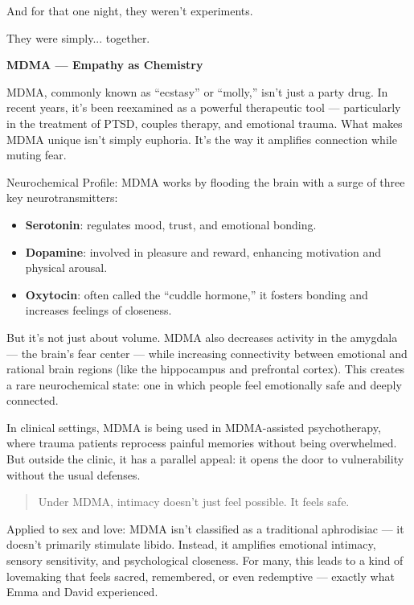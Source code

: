 And for that one night, they weren't experiments.

They were simply... together.

\begin{TechnicalSidebar}{\textbf{MDMA — Empathy as Chemistry}}

  MDMA, commonly known as “ecstasy” or “molly,” isn’t just a party drug. In recent years, it's been reexamined as a powerful therapeutic tool — particularly in the treatment of PTSD, couples therapy, and emotional trauma. What makes MDMA unique isn’t simply euphoria. It’s the way it amplifies connection while muting fear.
  
  \medskip
  
  Neurochemical Profile:
  MDMA works by flooding the brain with a surge of three key neurotransmitters:

  \medskip
  
  \begin{itemize}
    \item \textbf{Serotonin}: regulates mood, trust, and emotional bonding.
    \item \textbf{Dopamine}: involved in pleasure and reward, enhancing motivation and physical arousal.
    \item \textbf{Oxytocin}: often called the “cuddle hormone,” it fosters bonding and increases feelings of closeness.
  \end{itemize}
  
  But it’s not just about volume. MDMA also decreases activity in the amygdala — the brain’s fear center — while increasing connectivity between emotional and rational brain regions (like the hippocampus and prefrontal cortex). This creates a rare neurochemical state: one in which people feel emotionally safe and deeply connected.
  
  \medskip
  
  In clinical settings, MDMA is being used in MDMA-assisted psychotherapy, where trauma patients reprocess painful memories without being overwhelmed. But outside the clinic, it has a parallel appeal: it opens the door to vulnerability without the usual defenses.
  
  \begin{quote}
  Under MDMA, intimacy doesn’t just feel possible.
  It feels safe.
  \end{quote}
  
  \medskip
  
  Applied to sex and love:
  MDMA isn’t classified as a traditional aphrodisiac — it doesn't primarily stimulate libido. Instead, it amplifies emotional intimacy, sensory sensitivity, and psychological closeness. For many, this leads to a kind of lovemaking that feels sacred, remembered, or even redemptive — exactly what Emma and David experienced.


\end{TechnicalSidebar}
